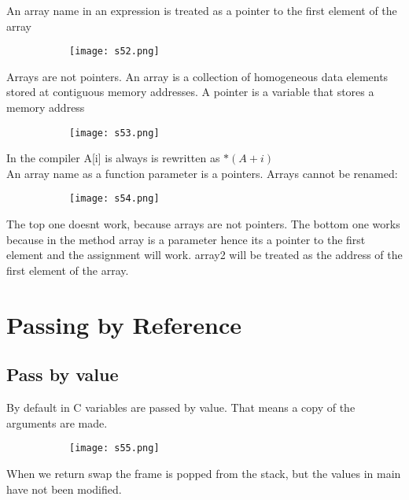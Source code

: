 \documentclass[8pt]{extreport}
\begin{document}
An array name in an expression is treated as a pointer to the first element of the array
\begin{figure}[H]
\centering
\begin{subfigure}[b]{0.4\linewidth}
\texttt{[image: s52.png]}
\end{subfigure}
\end{figure}
Arrays are not pointers. An array is a collection of homogeneous data elements stored at contiguous memory addresses. A pointer is a variable that stores a memory address
\begin{figure}[H]
\centering
\begin{subfigure}[b]{0.4\linewidth}
\texttt{[image: s53.png]}
\end{subfigure}
\end{figure}
In the compiler A[i] is always is rewritten as $*(A+i)$\\
An array name as a function parameter is a pointers.
Arrays cannot be renamed:
\begin{figure}[H]
\centering
\begin{subfigure}[b]{0.4\linewidth}
\texttt{[image: s54.png]}
\end{subfigure}
\end{figure}
The top one doesnt work, because arrays are not pointers.
The bottom one works because in the method array is a parameter hence its a pointer to the first element and the assignment will work. array2 will be treated as the address of the first element of the array.

\section{Passing by Reference}

\subsection{Pass by value}

By default in C variables are passed by value. That means a copy of the arguments are made.
\begin{figure}[H]
\centering
\begin{subfigure}[b]{0.4\linewidth}
\texttt{[image: s55.png]}
\end{subfigure}
\end{figure}
When we return swap the frame is popped from the stack, but the values in main have not been modified.
\end{document}
